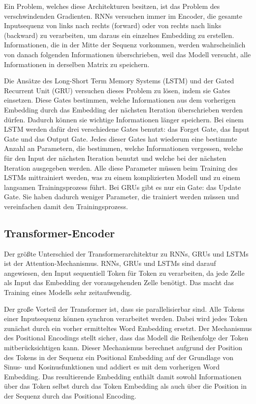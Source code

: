 Ein Problem, welches diese Architekturen besitzen, ist das Problem des verschwindenden Gradienten.
RNNs versuchen immer im Encoder, die gesamte Inputsequenz von links nach rechts (forward) oder von rechts nach links (backward) zu verarbeiten, um daraus ein einzelnes Embedding zu erstellen.
Informationen, die in der Mitte der Sequenz vorkommen, werden wahrscheinlich von danach folgenden Informationen überschrieben, weil das Modell versucht, alle Informationen in derselben Matrix zu speichern.

Die Ansätze des Long-Short Term Memory Systems (LSTM) und der Gated Recurrent Unit (GRU) versuchen dieses Problem zu lösen, indem sie Gates einsetzen.
Diese Gates bestimmen, welche Informationen aus dem vorherigen Embedding durch das Embedding der nächsten Iteration überschrieben werden dürfen.
Dadurch können sie wichtige Informationen länger speichern.
Bei einem LSTM werden dafür drei verschiedene Gates benutzt: das Forget Gate, das Input Gate und das Output Gate.
Jedes dieser Gates hat wiederum eine bestimmte Anzahl an Parametern, die bestimmen, welche Informationen vergessen, welche für den Input der nächsten Iteration benutzt und welche bei der nächsten Iteration ausgegeben werden.
Alle diese Parameter müssen beim Training des LSTMs mittrainiert werden, was zu einem komplizierten Modell und zu einem langsamen Trainingsprozess führt.
Bei GRUs gibt es nur ein Gate: das Update Gate.
Sie haben dadurch weniger Parameter, die trainiert werden müssen und vereinfachen damit den Trainingsprozess.~\cite{pirani2022}

\subsection{Transformer-Encoder}

Der größte Unterschied der Transformerarchitektur zu RNNs, GRUs und LSTMs ist der Attention-Mechanismus.
RNNs, GRUs und LSTMs sind darauf angewiesen, den Input sequentiell Token für Token zu verarbeiten, da jede Zelle als Input das Embedding der vorausgehenden Zelle benötigt.
Das macht das Training eines Modells sehr zeitaufwendig.

Der große Vorteil der Transformer ist, dass sie parallelisierbar sind.
Alle Tokens einer Inputsequenz können synchron verarbeitet werden.
Dabei wird jedes Token zunächst durch ein vorher ermitteltes Word Embedding ersetzt.
Der Mechanismus des Positional Encodings stellt sicher, dass das Modell die Reihenfolge der Token mitberücksichtigen kann.
Dieser Mechanismus berechnet aufgrund der Position des Tokens in der Sequenz ein Positional Embedding auf der Grundlage von Sinus- und Kosinusfunktionen und addiert es mit dem vorherigen Word Embedding.
Das resultierende Embedding enthält damit sowohl Informationen über das Token selbst durch das Token Embedding als auch über die Position in der Sequenz durch das Positional Encoding.

